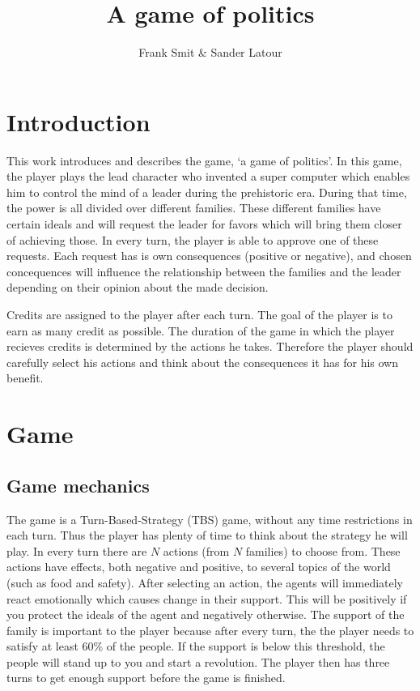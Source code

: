 \documentclass[11pt,a4paper]{article}
\author{Frank Smit \& Sander Latour}
\title{A game of politics}
\begin{document}
\maketitle

\section{Introduction}
This work introduces and describes the game, `a game of politics'. In this game, the player plays the lead character who invented a super computer which enables him to control the mind of a leader during the prehistoric era. During that time, the power is all divided over different families. These different families have certain ideals and will request the leader for favors which will bring them closer of achieving those. In every turn, the player is able to approve one of these requests. Each request has is own consequences (positive or negative), and chosen concequences will influence the relationship between the families and the leader depending on their opinion about the made decision.

Credits are assigned to the player after each turn. The goal of the player is to earn as many credit as possible. The duration of the game in which the player recieves credits is determined by the actions he takes. Therefore the player should carefully select his actions and think about the consequences it has for his own benefit.  

\section{Game}
\subsection{Game mechanics}
The game is a Turn-Based-Strategy (TBS) game, without any time restrictions in each turn. Thus the player has plenty of time to think about the strategy he will play. In every turn there are $N$ actions (from $N$ families) to choose from. These actions have effects, both negative and positive, to several topics of the world (such as food and safety).  After selecting an action, the agents will immediately react emotionally which causes change in their support. This will be positively if you protect the ideals of the agent and negatively otherwise. The support of the family is important to the player because after every turn, the the player needs to satisfy at least 60\% of the people. If the support is below this threshold, the people will stand up to you and start a revolution. The player then has three turns to get enough support before the game is finished.
\end{document}
